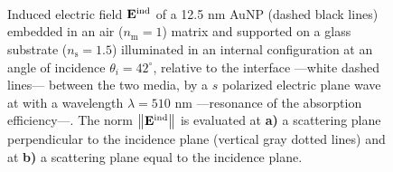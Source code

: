 \begin{figure}[h!]\centering
   \def\svgwidth{.75\textwidth}
   \footnotesize
   \\[-32.6em]
   \hspace*{-.25\textwidth}
       \begin{subfigure}{.25\textwidth}\textcolor{red}{\caption{ } \label{sfig:Near:Inc0:42:s1}}\end{subfigure}%
       \begin{subfigure}{.34\textwidth}\caption{ }\label{sfig:Near:Inc0:42:s2}\end{subfigure}\\[13em]
    \hspace*{-.25\textwidth}
       \begin{subfigure}{.25\textwidth}\textcolor{red}{\caption{ } \label{sfig:Near:Inc0:42:p1}}\end{subfigure}%
       \begin{subfigure}{.34\textwidth}\caption{ }\label{sfig:Near:Inc0:42:p2}\end{subfigure}\\[15em]
   \caption[Induced Electric Field of a 12.5 nm Au NP on substrate illuminated at oblique incidence with a $s$ polarized electric field]{Induced electric field $\vb{E}^\text{ind}$ of a 12.5 nm AuNP (dashed black lines) embedded in an air  ($n_\text{m} = 1$)  matrix and supported on a glass substrate ($n_\text{s} = 1.5$) illuminated in an internal configuration at an angle of incidence $\theta_i = 42^\circ$, relative to the interface ---white dashed lines--- between the two media, by a $s$ polarized electric plane wave at with a wavelength $\lambda = 510$ nm ---resonance of the absorption efficiency---.  The norm $\norm{\vb{E}^\text{ind}}$ is evaluated at  \textbf{a)} a scattering plane perpendicular to the incidence plane (vertical gray dotted lines) and at \textbf{b)} a scattering plane equal to the incidence plane. }
   \label{fig:Near:Inc0:42}
 \end{figure}
